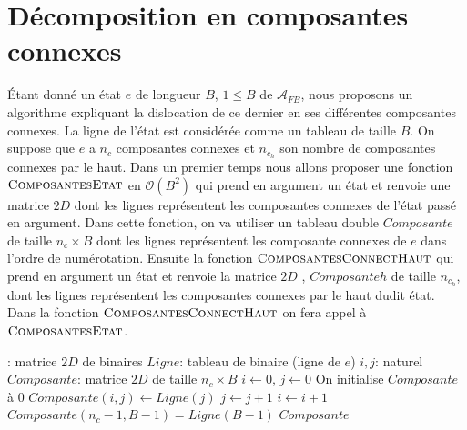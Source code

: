  \section{Décomposition en composantes connexes}
Étant donné un état $e$ de longueur $B$, $1\leq  B$ de $\mathcal{A}_{FB}$, nous proposons un algorithme expliquant la dislocation  de ce dernier en ses différentes composantes connexes. La ligne de l'état est considérée comme un tableau de taille $B$. On suppose que $e$ a $n_{c}$ composantes connexes et $n_{c_{h}}$ son nombre de composantes connexes  par le haut. Dans un premier temps nous allons proposer une fonction $\Call{ComposantesEtat}{}$  en $\mathcal{O}(B^{2})$  qui prend en argument un état et renvoie une matrice $2D$ dont les lignes représentent les composantes connexes de l'état passé en argument. Dans cette fonction, on va utiliser un tableau double $Composante$ de taille $n_{c}\times B$ dont les lignes représentent les composante connexes de $e$ dans l'ordre de numérotation. Ensuite la fonction $\Call{ComposantesConnectHaut}{}$ qui prend  en argument un état et renvoie la matrice $2D$ , $Composanteh$ de taille  $n_{c_{h}}$, dont les lignes  représentent les composantes connexes  par le haut dudit état. Dans la fonction $\Call{ComposantesConnectHaut}{}$ on fera appel à $\Call{ComposantesEtat}{}$. 
\begin{algorithmic}[1]
      :  matrice $2D$  de binaires
       \State $Ligne$: tableau de binaire (ligne de $e$)
       \State $i,j$: naturel
       \State $Composante$: matrice $2D$ de taille $n_{c}\times B$
       \State $i\leftarrow 0$, $j\leftarrow 0$
       \State On initialise $Composante$ à $0$
                       \State $Composante(i,j)\leftarrow Ligne(j)$
                \EndIf
                 \State$j\leftarrow j+1$
           \EndWhile
           \State $i\leftarrow i+1$
       \EndWhile
              \State $Composante(n_{c}-1,B-1)=Ligne(B-1)$
       \EndIf
        \State \Return $Composante$
   \EndFunction
  \end{algorithmic}
  

